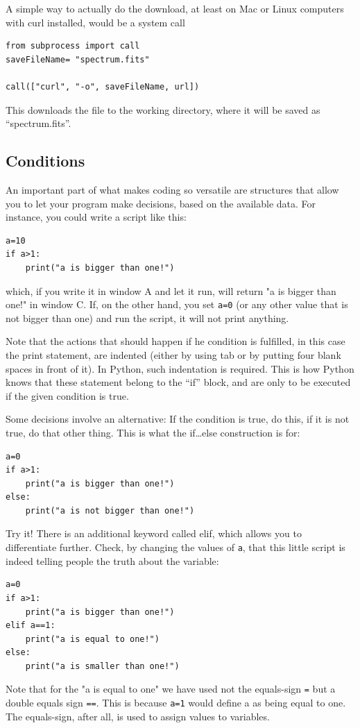 \documentclass[twocolumn,apj]{openjournal}
\begin{document}
A simple way to actually do the download, at least on Mac or Linux computers with curl installed, would be a system call
\begin{lstlisting}
from subprocess import call
saveFileName= "spectrum.fits"

call(["curl", "-o", saveFileName, url])
\end{lstlisting}
This downloads the file to the working directory, where it will be saved as ``spectrum.fits''.

\subsection{Conditions}
\label{Conditions}
An important part of what makes coding so versatile are structures that allow you to let your program make decisions, based on the available data. For instance, you could write a script like this:
\begin{lstlisting}
a=10
if a>1:
	print("a is bigger than one!")
\end{lstlisting}
which, if you write it in window A and let it run, will return "a is bigger than one!" in window C. If, on the other hand, you set \verb|a=0| (or any other value that is not bigger than one) and run the script, it will not print anything.

Note that the actions that should happen if he condition is fulfilled, in this case the print statement, are indented (either by using tab or by putting four blank spaces in front of it). In Python, such indentation is required. This is how Python knows that these statement belong to the ``if'' block, and are only to be executed if the given condition is true.

Some decisions involve an alternative: If the condition is true, do this, if it is not true, do that other thing. This is what the if\dots else construction is for:
\begin{lstlisting}
a=0
if a>1:
	print("a is bigger than one!")
else:
	print("a is not bigger than one!")
\end{lstlisting}
Try it! There is an additional keyword called elif, which allows you to differentiate further. Check, by changing the values of \verb|a|, that this little script is indeed telling people the truth about the variable:
\begin{lstlisting}
a=0
if a>1:
	print("a is bigger than one!")
elif a==1:
	print("a is equal to one!")
else:
	print("a is smaller than one!")
\end{lstlisting}
Note that for the "a is equal to one" we have used not the equals-sign \verb|=| but a double equals sign \verb|==|. This is because 
\verb|a=1| would define a as being equal to one. The equals-sign, after all, is used to assign values to variables.
\end{document}
